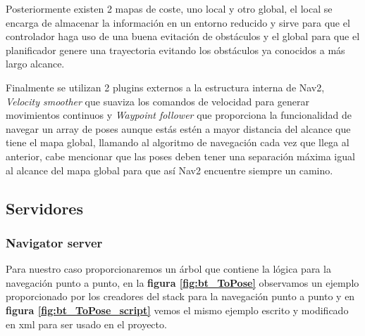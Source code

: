 Posteriormente existen 2 mapas de coste, uno local y otro global, el local se encarga de almacenar la información en un entorno reducido y sirve 
para que el controlador haga uso de una buena evitación de obstáculos  y el global para que el planificador genere una trayectoria evitando los obstáculos ya conocidos a más largo alcance.

Finalmente se utilizan 2 plugins externos a la estructura interna de Nav2, \textit{Velocity smoother} que suaviza los comandos de velocidad para generar movimientos continuos y 
\textit{Waypoint follower} que proporciona la funcionalidad de navegar un array de poses aunque estás estén a mayor distancia del alcance que tiene 
el mapa global, llamando al algoritmo de navegación cada vez que llega al anterior, cabe mencionar que las poses deben tener una separación máxima igual al 
alcance del mapa global para que así Nav2 encuentre siempre un camino.


\subsection{Servidores}
\subsubsection{Navigator server}
Para nuestro caso proporcionaremos un árbol que contiene la lógica para la navegación punto a punto, en la \textbf{figura \ref{fig:bt_ToPose}} observamos un ejemplo proporcionado por 
los creadores del stack para la navegación punto a punto y en  \textbf{figura \ref{fig:bt_ToPose_script}} vemos el mismo ejemplo escrito y modificado en xml para ser usado en 
el proyecto.

